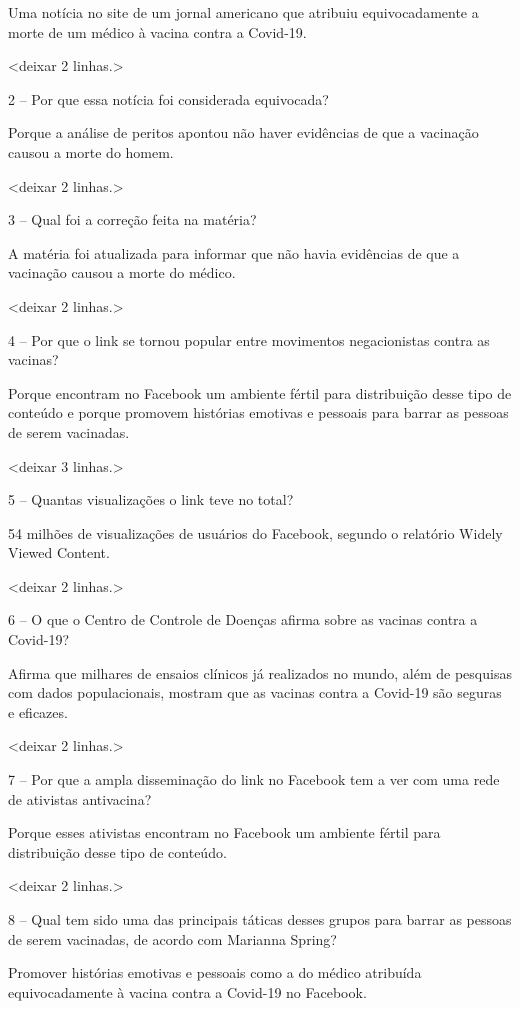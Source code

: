 Uma notícia no site de um jornal americano que atribuiu equivocadamente
a morte de um médico à vacina contra a Covid-19.

\textless{}deixar 2 linhas.\textgreater{}

2 -- Por que essa notícia foi considerada equivocada?

Porque a análise de peritos apontou não haver evidências de que a
vacinação causou a morte do homem.

\textless{}deixar 2 linhas.\textgreater{}

3 -- Qual foi a correção feita na matéria?

A matéria foi atualizada para informar que não havia evidências de que a
vacinação causou a morte do médico.

\textless{}deixar 2 linhas.\textgreater{}

4 -- Por que o link se tornou popular entre movimentos negacionistas
contra as vacinas?

Porque encontram no Facebook um ambiente fértil para distribuição desse
tipo de conteúdo e porque promovem histórias emotivas e pessoais para
barrar as pessoas de serem vacinadas.

\textless{}deixar 3 linhas.\textgreater{}

5 -- Quantas visualizações o link teve no total?

54 milhões de visualizações de usuários do Facebook, segundo o relatório
Widely Viewed Content.

\textless{}deixar 2 linhas.\textgreater{}

6 -- O que o Centro de Controle de Doenças afirma sobre as vacinas
contra a Covid-19?

Afirma que milhares de ensaios clínicos já realizados no mundo, além de
pesquisas com dados populacionais, mostram que as vacinas contra a
Covid-19 são seguras e eficazes.

\textless{}deixar 2 linhas.\textgreater{}

7 -- Por que a ampla disseminação do link no Facebook tem a ver com uma
rede de ativistas antivacina?

Porque esses ativistas encontram no Facebook um ambiente fértil para
distribuição desse tipo de conteúdo.

\textless{}deixar 2 linhas.\textgreater{}

8 -- Qual tem sido uma das principais táticas desses grupos para barrar
as pessoas de serem vacinadas, de acordo com Marianna Spring?

Promover histórias emotivas e pessoais como a do médico atribuída
equivocadamente à vacina contra a Covid-19 no Facebook.

